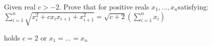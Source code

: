 Given real $c > -2$. Prove that for positive reals $x_1,...,x_n$satisfying:$\sum\limits_{i=1}^n \sqrt{x_i ^2+cx_ix_{i+1}+x_{i+1}^2}=\sqrt{c+2}\left( \sum\limits_{i=1}^n x_i \right)$

holds $c=2$ or $x_1=...=x_n$